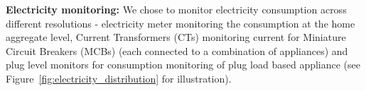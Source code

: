 \documentclass[10pt]{sensys-proc}
\newcommand{\figref}[1]{Figure~\ref{#1}}
\begin{document}
\noindent\textbf{Electricity monitoring:} %
We chose to monitor electricity consumption across different resolutions - electricity meter monitoring the consumption at the home aggregate level, Current Transformers (CTs) monitoring current for Miniature Circuit Breakers (MCBs) (each connected to a combination of appliances) and plug level monitors for consumption monitoring of plug load based appliance (see \figref{fig:electricity_distribution} for illustration). 
\end{document}
